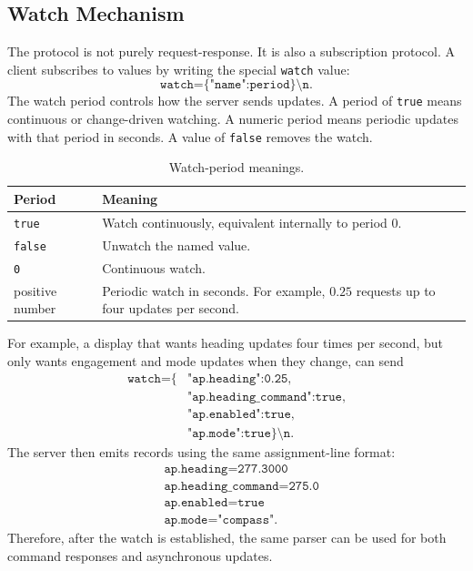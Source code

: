 \documentclass[10pt,twocolumn]{article}
\begin{document}
\subsection{Watch Mechanism}
The protocol is not purely request-response.  It is also a subscription
protocol.  A client subscribes to values by writing the special
\texttt{watch} value:
\[
\texttt{watch=\{"name":period\}\textbackslash n}.
\]
The watch period controls how the server sends updates.  A period of
\texttt{true} means continuous or change-driven watching.  A numeric
period means periodic updates with that period in seconds.  A value of
\texttt{false} removes the watch.
\begin{table}[!t]
\centering
\caption{Watch-period meanings.}
\label{tab:pypilot-watch-periods}
\begin{tabularx}{\columnwidth}{Z{0.36\columnwidth}Y}
\toprule
Period & Meaning \\
\midrule
\texttt{true} &
Watch continuously, equivalent internally to period \(0\). \\
\texttt{false} &
Unwatch the named value. \\
\texttt{0} &
Continuous watch. \\
positive number &
Periodic watch in seconds.  For example, \(0.25\) requests up to four
updates per second. \\
\bottomrule
\end{tabularx}
\end{table}
For example, a display that wants heading updates four times per second,
but only wants engagement and mode updates when they change, can send
\[
\begin{split}
\texttt{watch=\{}&
\texttt{"ap.heading":0.25,}\\
&
\texttt{"ap.heading\_command":true,}\\
&
\texttt{"ap.enabled":true,}\\
&
\texttt{"ap.mode":true\}\textbackslash n}.
\end{split}
\]
The server then emits records using the same assignment-line format:
\[
\begin{aligned}
&\texttt{ap.heading=277.3000}\\
&\texttt{ap.heading\_command=275.0}\\
&\texttt{ap.enabled=true}\\
&\texttt{ap.mode="compass"}.
\end{aligned}
\]
Therefore, after the watch is established, the same parser can be used for
both command responses and asynchronous updates.
\end{document}
